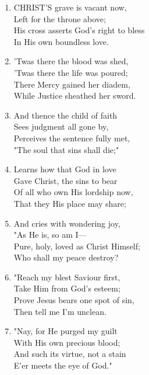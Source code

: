 \begin{enumerate}
    \item CHRIST'S grave is vacant now, \\
            Left for the throne above; \\
        His cross asserts God's right to bless \\
            In His own boundless love.

    \item 'Twas there the blood was shed, \\
            'Twas there the life was poured; \\
        There Mercy gained her diadem, \\
            While Justice sheathed her sword.

    \item And thence the child of faith \\
            Sees judgment all gone by, \\
        Perceives the sentence fully met, \\
            "The soul that sins shall die;"

    \item Learns how that God in love \\
            Gave Christ, the sins to bear \\
        Of all who own His lordship now, \\
            That they His place may share;

    \item And cries with wondering joy, \\
            "As He is, so am I--- \\
        Pure, holy, loved as Christ Himself; \\
            Who shall my peace destroy?

    \item "Reach my blest Saviour first, \\
            Take Him from God's esteem; \\
        Prove Jesus bears one spot of sin, \\
            Then tell me I'm unclean.

    \item "Nay, for He purged my guilt \\
            With His own precious blood; \\
        And such its virtue, not a stain \\
            E'er meets the eye of God."

\end{enumerate}


